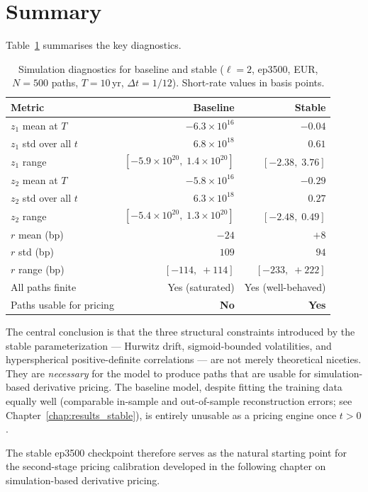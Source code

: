 \section{Summary}
\label{sec:sim_summary}

Table~\ref{tab:sim_comparison_summary} summarises the key diagnostics.

\begin{table}[H]
\centering
\caption{Simulation diagnostics for baseline and stable ($\ell = 2$, ep3500,
EUR, $N = 500$ paths, $T = 10$\,yr, $\Delta t = 1/12$).
Short-rate values in basis points.}
\label{tab:sim_comparison_summary}
\begin{tabular}{@{}lrr@{}}
\toprule
\textbf{Metric} & \textbf{Baseline} & \textbf{Stable} \\
\midrule
$z_1$ mean at $T$      & $-6.3 \times 10^{16}$ & $-0.04$ \\
$z_1$ std over all $t$ & $6.8 \times 10^{18}$  & $0.61$  \\
$z_1$ range            & $[-5.9\times10^{20},\; 1.4\times10^{20}]$ & $[-2.38,\; 3.76]$ \\
\midrule
$z_2$ mean at $T$      & $-5.8 \times 10^{16}$ & $-0.29$ \\
$z_2$ std over all $t$ & $6.3 \times 10^{18}$  & $0.27$  \\
$z_2$ range            & $[-5.4\times10^{20},\; 1.3\times10^{20}]$ & $[-2.48,\; 0.49]$ \\
\midrule
$r$ mean (bp)          & $-24$ & $+8$   \\
$r$ std (bp)           & $109$ & $94$   \\
$r$ range (bp)         & $[-114,\; +114]$ & $[-233,\; +222]$ \\
All paths finite       & Yes (saturated) & Yes (well-behaved) \\
Paths usable for pricing & \textbf{No} & \textbf{Yes} \\
\bottomrule
\end{tabular}
\end{table}

The central conclusion is that the three structural constraints introduced by
the stable parameterization --- Hurwitz drift, sigmoid-bounded volatilities, and
hyperspherical positive-definite correlations --- are not merely theoretical
niceties.
They are \emph{necessary} for the model to produce paths that are usable for
simulation-based derivative pricing.
The baseline model, despite fitting the training data equally well
(comparable in-sample and out-of-sample reconstruction errors; see
Chapter~\ref{chap:results_stable}), is entirely unusable as a pricing engine
once $t > 0$.

The stable ep3500 checkpoint therefore serves as the natural starting point for
the second-stage pricing calibration developed in the following chapter on
simulation-based derivative pricing.


